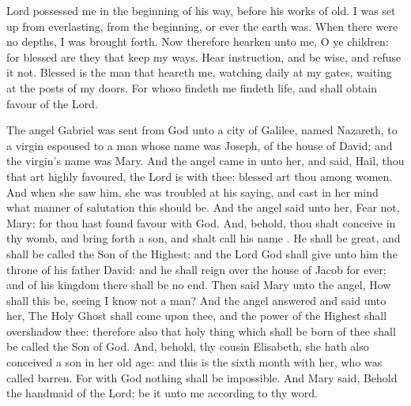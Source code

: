  Lord possessed me in the beginning of his way, before his works of old. I was set up from everlasting, from the beginning, or ever the earth was. When there were no depths, I was brought forth. Now therefore hearken unto me, O ye children: for blessed are they that keep my ways. Hear instruction, and be wise, and refuse it not. Blessed is the man that heareth me, watching daily at my gates, waiting at the posts of my doors. For whoso findeth me findeth life, and shall obtain favour of the Lord.


 The angel Gabriel was sent from God unto a city of Galilee, named Nazareth, to a virgin espoused to a man whose name was Joseph, of the house of David; and the virgin’s name was Mary. And the angel came in unto her, and said, Hail, thou that art highly favoured, the Lord is with thee: blessed art thou among women. And when she saw him, she was troubled at his saying, and cast in her mind what manner of salutation this should be. And the angel said unto her, Fear not, Mary: for thou hast found favour with God. And, behold, thou shalt conceive in thy womb, and bring forth a son, and shalt call his name . He shall be great, and shall be called the Son of the Highest: and the Lord God shall give unto him the throne of his father David: and he shall reign over the house of Jacob for ever; and of his kingdom there shall be no end. Then said Mary unto the angel, How shall this be, seeing I know not a man? And the angel answered and said unto her, The Holy Ghost shall come upon thee, and the power of the Highest shall overshadow thee: therefore also that holy thing which shall be born of thee shall be called the Son of God. And, behold, thy cousin Elisabeth, she hath also conceived a son in her old age: and this is the sixth month with her, who was called barren. For with God nothing shall be impossible. And Mary said, Behold the handmaid of the Lord; be it unto me according to thy word.


